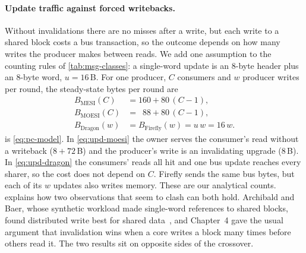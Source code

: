 \paragraph{Update traffic against forced writebacks.} Without invalidations there
are no misses after a write, but each write to a shared block costs a bus
transaction, so the outcome depends on how many writes the producer makes between
reads. We add one assumption to the counting rules of \cref{tab:msg-classes}: a
single-word update is an 8-byte header plus an 8-byte word, $u=16$\,B. For one
producer, $C$ consumers and $w$ producer writes per round, the steady-state bytes
per round are
\begin{align}
  B_{\mathrm{MESI}}(C)            &= 160 + 80\,(C-1), \label{eq:upd-mesi}\\
  B_{\mathrm{MOESI}}(C)           &= \phantom{1}88 + 80\,(C-1), \label{eq:upd-moesi}\\
  B_{\mathrm{Dragon}}(w)          &= B_{\mathrm{Firefly}}(w) = u\,w = 16\,w. \label{eq:upd-dragon}
\end{align}
 is \cref{eq:pc-model}. In \cref{eq:upd-moesi} the owner serves
the consumer's read without a writeback ($8+72$\,B) and the producer's write is an
invalidating upgrade (8\,B). In \cref{eq:upd-dragon} the consumers' reads all hit
and one bus update reaches every sharer, so the cost does not depend on $C$.
Firefly sends the same bus bytes, but each of its $w$ updates also writes memory.
These are our analytical counts.  explains how two
observations that seem to clash can both hold. Archibald and Baer, whose synthetic
workload made single-word references to shared blocks, found distributed write
best for shared data~\cite[p.~294]{archibald1986evaluation}, and Chapter~4 gave the
usual argument that invalidation wins when a core writes a block many times before
others read it. The two results sit on opposite sides of the crossover.

